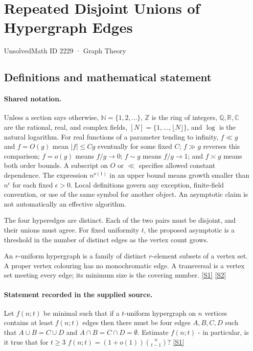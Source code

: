 \documentclass[11pt,a4paper]{article}
\newcommand{\N}{\mathbb{N}}
\newcommand{\Z}{\mathbb{Z}}
\newcommand{\Q}{\mathbb{Q}}
\newcommand{\R}{\mathbb{R}}
\newcommand{\C}{\mathbb{C}}
\newcommand{\sref}[2]{\hyperlink{source:#1:#2}{[S#2]}}
\begin{document}

\setcounter{section}{2228}

\section{Repeated Disjoint Unions of Hypergraph Edges}\label{2229}

{\small\sffamily UnsolvedMath ID 2229 · Graph Theory}

\subsection{Definitions and mathematical statement}

\paragraph{Shared notation.}Unless a section says otherwise, $\N=\{1,2,\ldots\}$,
$\Z$ is the ring of integers, $\Q,\R,\C$ are the rational, real, and complex
fields, $[N]=\{1,\ldots,\lfloor N\rfloor\}$, and $\log$ is the natural
logarithm. For real functions of a parameter tending to infinity,
$f\ll g$ and $f=O(g)$ mean $|f|\leq Cg$ eventually for some fixed $C$;
$f\gg g$ reverses this comparison; $f=o(g)$ means $f/g\to0$;
$f\sim g$ means $f/g\to1$; and $f\asymp g$ means both order bounds.
A subscript on $O$ or $\ll$ specifies allowed constant dependence.
The expression $n^{o(1)}$ in an upper bound means growth smaller than
$n^\epsilon$ for each fixed $\epsilon>0$. Local definitions govern any
exception, finite-field convention, or use of the same symbol for another
object. An asymptotic claim is not automatically an effective algorithm.



The four hyperedges are distinct. Each of the two pairs must be disjoint, and their unions must agree. For fixed uniformity $t$, the proposed asymptotic is a threshold in the number of distinct edges as the vertex count grows.

An $r$-uniform hypergraph is a family of distinct $r$-element subsets of a vertex set. A proper vertex colouring has no monochromatic edge. A transversal is a vertex set meeting every edge; its minimum size is the covering number. \sref{2229}{1} \sref{2229}{2}

\paragraph{Statement recorded in the supplied source.}
Let $f(n;t)$ be minimal such that if a $t$-uniform hypergraph on $n$ vertices contains at least $f(n;t)$ edges then there must be four edges $A,B,C,D$ such that $ A\cup B= C\cup D $ and $ A\cap B=C\cap D=\emptyset. $ Estimate $f(n;t)$ - in particular, is it true that for $t\geq 3$ $ f(n;t)=(1+o(1))\binom{n}{t-1}? $ \sref{2229}{1}
\end{document}
